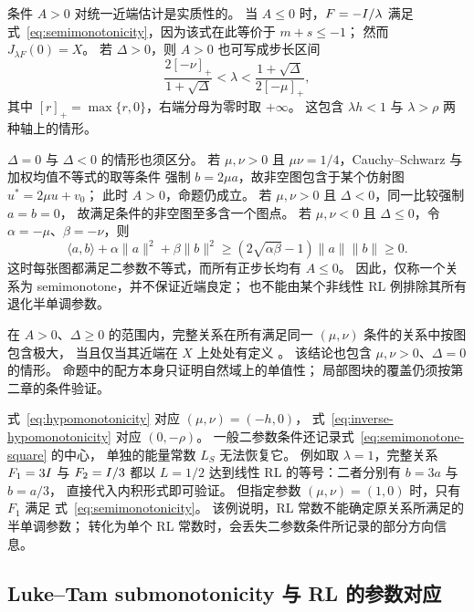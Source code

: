 \begin{remark}[参数边界与完整输入域]
\label{rem:semimonotone-boundary}
条件 $A>0$ 对统一近端估计是实质性的。
当 $A\le0$ 时，$F=-I/\lambda$ 满足
式~\eqref{eq:semimonotonicity}，因为该式在此等价于 $m+s\le-1$；
然而 $J_{\lambda F}(0)=X$。
若 $\Delta>0$，则 $A>0$ 也可写成步长区间
\[
 \frac{2[-\nu]_+}{1+\sqrt\Delta}<\lambda<
 \frac{1+\sqrt\Delta}{2[-\mu]_+},
\]
其中 $[r]_+=\max\{r,0\}$，右端分母为零时取 $+\infty$。
这包含 $\lambda h<1$ 与 $\lambda>\rho$ 两种轴上的情形。

$\Delta=0$ 与 $\Delta<0$ 的情形也须区分。
若 $\mu,\nu>0$ 且 $\mu\nu=1/4$，Cauchy--Schwarz 与加权均值不等式的取等条件
强制 $b=2\mu a$，故非空图包含于某个仿射图 $u^*=2\mu u+v_0$；
此时 $A>0$，命题仍成立。
若 $\mu,\nu>0$ 且 $\Delta<0$，同一比较强制 $a=b=0$，
故满足条件的非空图至多含一个图点。
若 $\mu,\nu<0$ 且 $\Delta\le0$，令 $\alpha=-\mu$、$\beta=-\nu$，则
\[
 \langle a,b\rangle+\alpha\|a\|^2+\beta\|b\|^2
 \ge(2\sqrt{\alpha\beta}-1)\|a\|\|b\|\ge0.
\]
这时每张图都满足二参数不等式，而所有正步长均有 $A\le0$。
因此，仅称一个关系为 semimonotone，并不保证近端良定；
也不能由某个非线性 RL 例排除其所有退化半单调参数。

在 $A>0$、$\Delta\ge0$ 的范围内，完整关系在所有满足同一
$(\mu,\nu)$ 条件的关系中按图包含极大，
当且仅当其近端在 $X$ 上处处有定义
\cite[Proposition~4.12]{EvensEtAl2024SemimonotoneV2}。
该结论也包含 $\mu,\nu>0$、$\Delta=0$ 的情形。
命题中的配方本身只证明自然域上的单值性；
局部图块的覆盖仍须按第二章的条件验证。
\end{remark}

\begin{remark}[两个参数保留的信息]
\label{rem:semimonotone-information}
式~\eqref{eq:hypomonotonicity} 对应 $(\mu,\nu)=(-h,0)$，
式~\eqref{eq:inverse-hypomonotonicity} 对应 $(0,-\rho)$。
一般二参数条件还记录式~\eqref{eq:semimonotone-square} 的中心，
单独的能量常数 $L_S$ 无法恢复它。
例如取 $\lambda=1$，完整关系 $F_1=3I$ 与 $F_2=I/3$
都以 $L=1/2$ 达到线性 RL 的等号：二者分别有 $b=3a$ 与 $b=a/3$，
直接代入内积形式即可验证。
但指定参数 $(\mu,\nu)=(1,0)$ 时，只有 $F_1$ 满足
式~\eqref{eq:semimonotonicity}。
该例说明，RL 常数不能确定原关系所满足的半单调参数；
转化为单个 RL 常数时，会丢失二参数条件所记录的部分方向信息。
\end{remark}

\subsection{Luke--Tam submonotonicity 与 RL 的参数对应}
\label{subsec:lt-submonotonicity}

